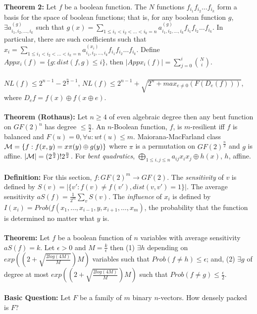 {\bf Theorem 2:}  Let $f$ be a boolean function.  The $N$ functions
$f_{i_1} f_{i_2} \ldots f_{i_k}$ form a basis for the space of boolean functions; that is,
for any boolean function $g$,
$\exists a^{(g)}_{i_1, i_2, \ldots, i_k}$ such that $g(x)= \sum_{1\le i_1 < i_2< \ldots < i_k = n}
a^{(g)}_{i_1, i_2, \ldots, i_k}
f_{i_1} f_{i_2} \ldots f_{i_k}$.  In particular, there are such coefficients such that
$x_i= \sum_{1\le i_1 < i_2< \ldots < i_k = n}
a^{(x_i)}_{i_1, i_2, \ldots, i_k} f_{i_1} f_{i_2} \ldots f_{i_k}$.  Define
$Appx_i(f)= \{ g: dist(f,g) \le i \}$, then $|Appx_i(f)|= \sum_{j=0}^i{N \choose i}$.
\\
\\
$NL(f) \le 2^{n-1}- 2^{{\frac n 2} -1}$,  $NL(f) \le 2^{n-1} +
{\sqrt {2^n + max_{e \ne 0} (F(D_e(f)))}}$, where $D_e f = f(x) \oplus f(x \oplus e)$.
\\
\\
{\bf Theorem (Rothaus):} Let $n \ge 4$ of even algebraic degree then any bent function
on $GF(2)^n$ has degree $\le {\frac n 2}$. An $n$-Boolean function, $f$, is $m$-resilient
iff $f$ is balanced and $F(u)=0, \forall u: wt(u) \le m$.  
Maiorana-MacFarland class ${\cal M}= \{f: f(x,y)=x \pi(y) \oplus g(y) \}$ where $\pi$ is
a permutation on $GF(2)^{\frac n 2}$ and $g$ is affine.  
$|{\cal M}|= (2^{\frac n 2})! 2^{\frac n 2}$.   
For \emph{bent quadratics}, $\bigoplus_{1 \le i,j \le n}
a_{ij} x_i x_j \oplus h(x)$, $h$, affine.
\\
\\
{\bf Definition:}
For this section, $f:GF(2)^m \rightarrow GF(2)$.  The \emph{sensitivity} of $v$
is defined by $S(v) = | \{ v': f(v) \ne f(v'), dist(v,v') = 1 \}|$.  The average sensitivity
$aS(f)= {\frac 1 {2^m}} \sum_v S(v)$.  The \emph{influence} of $x_i$
is defined by
$I(x_i)= Prob(f(x_1,\ldots,x_{i-1},y,x_{i+1},\ldots, x_m)$, the probability
that the function is determined no matter what $y$ is.
\\
\\
{\bf Theorem:}  Let $f$ be a boolean function of $n$ variables with average
sensitivity $aS(f)=k$.  Let $\epsilon > 0$ and $M={\frac k {\epsilon}}$ then
(1) $\exists h$ depending on 
$exp((2+{\sqrt {\frac {2 log(4M)} M}})M)$ variables
such that $Prob(f \ne h) \le \epsilon$; and,
(2) $\exists g$ of degree at most
$exp((2+{\sqrt {\frac {2 log(4M)} M}})M)$ such that $Prob(f \ne g) \le {\frac {\epsilon} 2}$.
\\
\\
{\bf Basic Question:}
Let $F$ be a family of $m$ binary $n$-vectors.  How densely packed is $F$?
